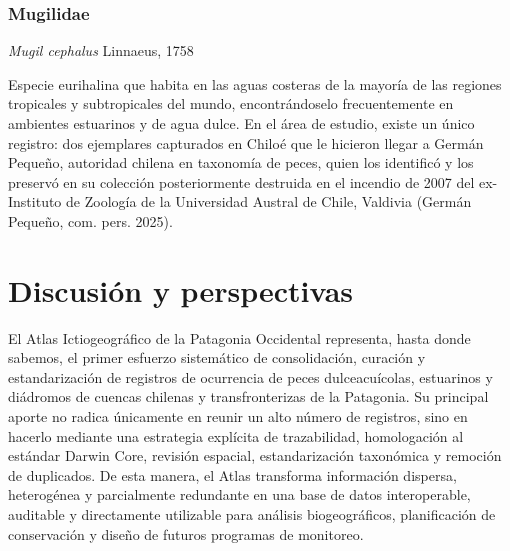 \documentclass[sn-apa,pdflatex]{sn-jnl}
\begin{document}
\subsubsection{Mugilidae}\label{mugilidae}

\emph{Mugil cephalus} Linnaeus, 1758

Especie eurihalina que habita en las aguas costeras de la mayoría de las
regiones tropicales y subtropicales del mundo, encontrándoselo
frecuentemente en ambientes estuarinos y de agua dulce. En el área de
estudio, existe un único registro: dos ejemplares capturados en Chiloé
que le hicieron llegar a Germán Pequeño, autoridad chilena en taxonomía
de peces, quien los identificó y los preservó en su colección
posteriormente destruida en el incendio de 2007 del ex-Instituto de
Zoología de la Universidad Austral de Chile, Valdivia (Germán Pequeño,
com. pers. 2025).

\newpage

\section{Discusión y perspectivas}\label{discusiuxf3n-y-perspectivas}

El Atlas Ictiogeográfico de la Patagonia Occidental representa, hasta
donde sabemos, el primer esfuerzo sistemático de consolidación, curación
y estandarización de registros de ocurrencia de peces dulceacuícolas,
estuarinos y diádromos de cuencas chilenas y transfronterizas de la
Patagonia. Su principal aporte no radica únicamente en reunir un alto
número de registros, sino en hacerlo mediante una estrategia explícita
de trazabilidad, homologación al estándar Darwin Core, revisión
espacial, estandarización taxonómica y remoción de duplicados. De esta
manera, el Atlas transforma información dispersa, heterogénea y
parcialmente redundante en una base de datos interoperable, auditable y
directamente utilizable para análisis biogeográficos, planificación de
conservación y diseño de futuros programas de monitoreo.
\end{document}
